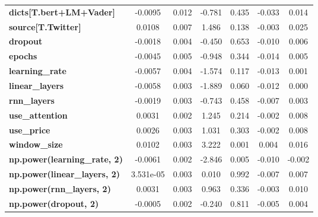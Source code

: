 \begin{center}
\begin{tabular}{lcccccc}
\textbf{dicts[T.bert+LM+Vader]}      &      -0.0095  &        0.012     &    -0.781  &         0.435        &       -0.033    &        0.014     \\
\textbf{source[T.Twitter]}           &       0.0108  &        0.007     &     1.486  &         0.138        &       -0.003    &        0.025     \\
\textbf{dropout}                     &      -0.0018  &        0.004     &    -0.450  &         0.653        &       -0.010    &        0.006     \\
\textbf{epochs}                      &      -0.0045  &        0.005     &    -0.948  &         0.344        &       -0.014    &        0.005     \\
\textbf{learning\_rate}              &      -0.0057  &        0.004     &    -1.574  &         0.117        &       -0.013    &        0.001     \\
\textbf{linear\_layers}              &      -0.0058  &        0.003     &    -1.889  &         0.060        &       -0.012    &        0.000     \\
\textbf{rnn\_layers}                 &      -0.0019  &        0.003     &    -0.743  &         0.458        &       -0.007    &        0.003     \\
\textbf{use\_attention}              &       0.0031  &        0.002     &     1.245  &         0.214        &       -0.002    &        0.008     \\
\textbf{use\_price}                  &       0.0026  &        0.003     &     1.031  &         0.303        &       -0.002    &        0.008     \\
\textbf{window\_size}                &       0.0102  &        0.003     &     3.222  &         0.001        &        0.004    &        0.016     \\
\textbf{np.power(learning\_rate, 2)} &      -0.0061  &        0.002     &    -2.846  &         0.005        &       -0.010    &       -0.002     \\
\textbf{np.power(linear\_layers, 2)} &    3.531e-05  &        0.003     &     0.010  &         0.992        &       -0.007    &        0.007     \\
\textbf{np.power(rnn\_layers, 2)}    &       0.0031  &        0.003     &     0.963  &         0.336        &       -0.003    &        0.010     \\
\textbf{np.power(dropout, 2)}        &      -0.0005  &        0.002     &    -0.240  &         0.811        &       -0.005    &        0.004     \\

\end{tabular}
\end{center}
